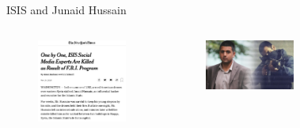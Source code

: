 \documentclass[nobackground,dvipsnames,table]{beamer}
\begin{document}
\begin{frame}{ISIS and Junaid Hussain}
    \begin{columns}
            \begin{figure}
                \centering
                \includegraphics[width=\textwidth]{isis-nyt-article}
            \end{figure}
            \begin{figure}
                \centering
                \includegraphics[width=\textwidth]{junaid-hussain}
            \end{figure}
            \vspace{0.5 cm}
            \begin{figure}

\end{figure}
\end{columns}
\end{frame}
\end{document}
